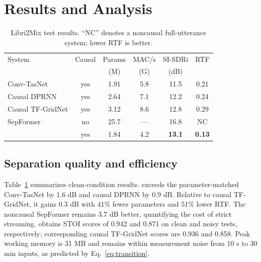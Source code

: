 \section{Results and Analysis}
\label{sec:results}

\begin{table}[t]
\caption{Libri2Mix test results.  ``NC'' denotes a noncausal full-utterance
system; lower RTF is better.}
\label{tab:main}
\centering
\small
\setlength{\tabcolsep}{3.2pt}
\begin{tabular}{lccccc}
\toprule
System & Causal & Params & MAC/s & SI-SDRi & RTF \\
       &        & (M)    & (G)   & (dB)    &     \\
\midrule
Conv-TasNet       & yes & 1.91 & 5.8 & 11.5 & 0.21 \\
Causal DPRNN      & yes & 2.64 & 7.1 & 12.2 & 0.24 \\
Causal TF-GridNet & yes & 3.12 & 8.6 & 12.8 & 0.29 \\
SepFormer         & no  & 25.7 &  --- & 16.8 & NC   \\
\model{}          & yes & 1.84 & 4.2 & \textbf{13.1} & \textbf{0.13} \\
\bottomrule
\end{tabular}
\end{table}

\subsection{Separation quality and efficiency}

Table~\ref{tab:main} summarizes clean-condition results.  \model{} exceeds the
parameter-matched Conv-TasNet by 1.6 dB and causal DPRNN by 0.9 dB.  Relative to
causal TF-GridNet, it gains 0.3 dB with 41\% fewer parameters and 51\% lower RTF.
The noncausal SepFormer remains 3.7 dB better, quantifying the cost of strict
streaming.  \model{} obtains STOI scores of 0.942 and 0.871 on clean and noisy
tests, respectively; corresponding causal TF-GridNet scores are 0.936 and 0.858.
Peak working memory is 31 MB and remains within measurement noise from 10 s to
30 min inputs, as predicted by Eq.~\eqref{eq:transition}.

\begin{table}[t]
\caption{Ablation study on Libri2Mix.  All variants remain causal.}
\label{tab:ablation}
\centering
\small
{}
\end{table}

